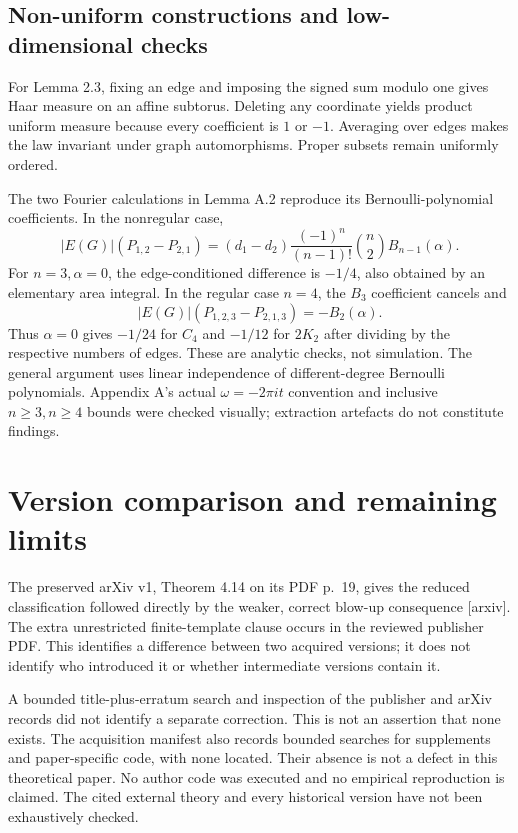 \documentclass[10pt]{article}
\begin{document}
\subsection*{Non-uniform constructions and low-dimensional checks}
For Lemma 2.3, fixing an edge and imposing the signed sum modulo one gives Haar measure on an affine subtorus. Deleting any coordinate yields product uniform measure because every coefficient is \(1\) or \(-1\). Averaging over edges makes the law invariant under graph automorphisms. Proper subsets remain uniformly ordered.\par
The two Fourier calculations in Lemma A.2 reproduce its Bernoulli-polynomial coefficients. In the nonregular case, \[|E(G)|(P_{1,2}-P_{2,1})
 =(d_1-d_2)\frac{(-1)^n}{(n-1)!}\binom n2 B_{n-1}(\alpha).\] For \(n=3,\alpha=0\), the edge-conditioned difference is \(-1/4\), also obtained by an elementary area integral. In the regular case \(n=4\), the \(B_3\) coefficient cancels and \[|E(G)|(P_{1,2,3}-P_{2,1,3})=-B_2(\alpha).\] Thus \(\alpha=0\) gives \(-1/24\) for \(C_4\) and \(-1/12\) for \(2K_2\) after dividing by the respective numbers of edges. These are analytic checks, not simulation. The general argument uses linear independence of different-degree Bernoulli polynomials. Appendix A’s actual \(\omega=-2\pi it\) convention and inclusive \(n\ge3,n\ge4\) bounds were checked visually; extraction artefacts do not constitute findings.\par
\section*{Version comparison and remaining limits}
The preserved arXiv v1, Theorem 4.14 on its PDF p. 19, gives the reduced classification followed directly by the weaker, correct blow-up consequence [arxiv]. The extra unrestricted finite-template clause occurs in the reviewed publisher PDF. This identifies a difference between two acquired versions; it does not identify who introduced it or whether intermediate versions contain it.\par
A bounded title-plus-erratum search and inspection of the publisher and arXiv records did not identify a separate correction. This is not an assertion that none exists. The acquisition manifest also records bounded searches for supplements and paper-specific code, with none located. Their absence is not a defect in this theoretical paper. No author code was executed and no empirical reproduction is claimed. The cited external theory and every historical version have not been exhaustively checked.\par
\end{document}
